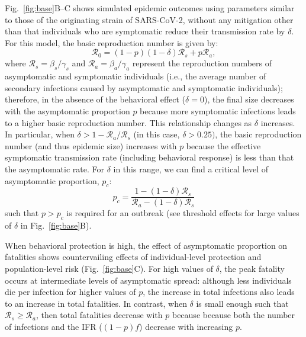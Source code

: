 \documentclass[12pt]{article}
\newcommand{\fref}[1]{Fig.~\ref{fig:#1}}
\newcommand{\RR}{\ensuremath{{\mathcal R}}\xspace}
\begin{document}
\fref{base}B--C shows simulated epidemic outcomes using parameters similar to those of the originating strain of SARS-CoV-2, without any mitigation other than that individuals who are symptomatic reduce their transmission rate by $\delta$. 
For this model, the basic reproduction number is given by:
\begin{equation}
\RR_0 = (1-p) (1-\delta) \RR_s + p \RR_a,
\end{equation}
where $\RR_s = \beta_s/\gamma_s$ and $\RR_a = \beta_a/\gamma_a$ represent the reproduction numbers of asymptomatic and symptomatic individuals (i.e., the average number of secondary infections caused by asymptomatic and symptomatic individuals);
therefore, in the absence of the behavioral effect ($\delta=0$), the final size decreases with the asymptomatic proportion $p$ because more symptomatic infections leads to a higher basic reproduction number.
This relationship changes as $\delta$ increases.
In particular, when $\delta > 1-\RR_a/\RR_s$ (in this case, $\delta > 0.25)$, the basic reproduction number (and thus epidemic size) increases with $p$ because the effective symptomatic transmission rate (including behavioral response) is less than that the asymptomatic rate.
For $\delta$ in this range, we can find a critical level of asymptomatic proportion, $p_c$:
\begin{equation}
    p_c = \frac{1 - (1-\delta) \RR_s}{\RR_a - (1-\delta) \RR_s}
\end{equation}
such that $p>p_c$ is required for an outbreak (see threshold effects for large values of $\delta$ in \fref{base}B).

When behavioral protection is high, the effect of asymptomatic proportion on fatalities shows countervailing effects of individual-level protection and population-level risk (\fref{base}C).
For high values of $\delta$, the peak fatality occurs at intermediate levels of asymptomatic spread:
although less individuals die per infection for higher values of $p$, the increase in total infections also leads to an increase in total fatalities.
In contrast, when $\delta$ is small enough such that $\RR_s\geq\RR_a$, then total fatalities decrease with $p$ because because both the number of infections and the IFR ($(1-p)f$) decrease with increasing $p$.
\end{document}
